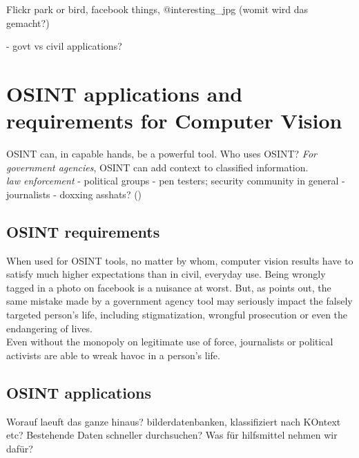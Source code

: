 \documentclass[twoside,a4paper]{article}
\begin{document}
Flickr park or bird, facebook things, @interesting\_jpg (womit wird das gemacht?)

- govt vs civil applications?

\section{OSINT applications and requirements for Computer Vision}
\label{sec:osint_req_app}

OSINT can, in capable hands, be a powerful tool. 
Who uses OSINT?
\emph{For government agencies}, OSINT can add context to classified information.\\
\emph{law enforcement}
- political groups
- pen testers\cite{unauth_access}; security community in general
- journalists
- doxxing asshats? ()

\subsection{OSINT requirements}
\label{subsec:osint_req}

When used for OSINT tools, no matter by whom, computer vision results have to satisfy much higher expectations than in civil, everyday use. Being wrongly tagged in a photo on facebook is a nuisance at worst. But, as \cite{derosa2004data} points out, the same mistake made by a government agency tool may seriously impact the falsely targeted person's life, including stigmatization, wrongful prosecution or even the endangering of lives.\\
Even without the monopoly on legitimate use of force, journalists or political activists are able to wreak havoc in a person's life.\\


\subsection{OSINT applications}
\label{subsec:osint_app}

Worauf laeuft das ganze hinaus? bilderdatenbanken, klassifiziert nach KOntext etc? Bestehende Daten schneller durchsuchen? Was für hilfsmittel nehmen wir dafür?
\end{document}

